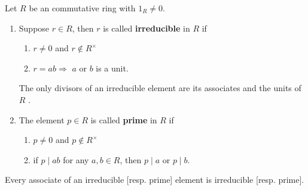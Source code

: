 \begin{definition}
    Let $R$ be an commutative ring with $1_R\neq 0$.

    \begin{enumerate}
        \item  Suppose $r \in R$, then $r$ is called \textbf{irreducible} in $R$ if
              \begin{enumerate}[label=(\roman*)]
                  \item $r \neq 0$ and $r \notin R^\times$
                  \item $r=ab \Rightarrow$ $a$ or $b$ is a unit.
              \end{enumerate}
              The only divisors of an irreducible element are its associates and the units of $R$ .

        \item  The element $p \in R$ is called \textbf{prime} in $R$ if
              \begin{enumerate}[label=(\roman*)]
                  \item $p\neq 0$ and $p \not\in R^\times$
                  \item if $p \mid a b$ for any $a, b \in R$, then $p \mid a$ or $p \mid b$.
              \end{enumerate}
    \end{enumerate}
    \begin{remark}
        Every associate of an irreducible [resp. prime] element is irreducible [resp. prime].
    \end{remark}
\end{definition}

